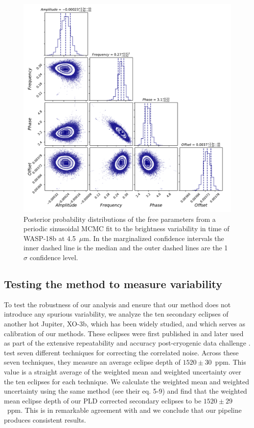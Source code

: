 \begin{figure}
    \centering
    \includegraphics[width=\linewidth]{MCMCcorner.pdf}
    \caption{Posterior probability distributions of the free parameters from a periodic sinusoidal MCMC fit to the brightness variability in time of WASP-18b at 4.5~$\mu$m. In the marginalized confidence intervals the inner dashed line is the median and the outer dashed lines are the 1$\sigma$ confidence level. }
    \label{P3:fig:MCMCcorner}
\end{figure}

\subsection{Testing the method to measure variability}

To test the robustness of our analysis and ensure that our method does not introduce any spurious variability, we analyze the ten secondary eclipses of another hot Jupiter, XO-3b, which has been widely studied, and which serves as calibration of our methods. These eclipses were first published in \citet{Wong2014} and later used as part of the extensive repeatability and accuracy post-cryogenic \spitzerIRAC data challenge \citep{Ingalls2016}. \citet{Ingalls2016} test seven different techniques for correcting the correlated noise. Across these seven techniques, they measure an average eclipse depth of $1520 \pm 30$~ppm. This value is a straight average of the weighted mean and weighted uncertainty over the ten eclipses for each technique. We calculate the weighted mean and weighted uncertainty using the same method (see their eq. 5-9) and find that the weighted mean eclipse depth of our PLD corrected secondary eclipses to be $1520 \pm 29$~ppm. This is in remarkable agreement with \citet{Ingalls2016} and we conclude that our pipeline produces consistent results.

